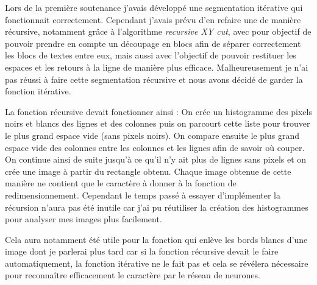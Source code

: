 \documentclass[12pt]{report}
\begin{document}
Lors de la première soutenance j'avais développé une segmentation itérative qui fonctionnait correctement. Cependant j'avais prévu d'en refaire une de manière récursive, notamment grâce à l'algorithme \textit{recursive XY cut}, avec pour objectif de pouvoir prendre en compte un découpage en blocs afin de séparer correctement les blocs de textes entre eux, mais aussi avec l'objectif de pouvoir restituer les espaces et les retours à la ligne de manière plus efficace. Malheureusement je n'ai pas réussi à faire cette segmentation récursive et nous avons décidé de garder la fonction itérative. 

La fonction récursive devait fonctionner ainsi : On crée un histogramme des pixels noirs et blancs des lignes et des colonnes puis on parcourt cette liste pour trouver le plus grand espace vide (sans pixels noirs). On compare ensuite le plus grand espace vide des colonnes entre les colonnes et les lignes afin de savoir où couper. On continue ainsi de suite jusqu'à ce qu'il n'y ait plus de lignes sans pixels et on crée une image à partir du rectangle obtenu. Chaque image obtenue de cette manière ne contient que le caractère à donner à la fonction de redimensionnement.
Cependant le temps passé à essayer d'implémenter la récursion n'aura pas été inutile car j'ai pu réutiliser la création des histogrammes pour analyser mes images plus facilement. 

\newpage

Cela aura notamment été utile pour la fonction qui enlève les bords blancs d'une image dont je parlerai plus tard car si la fonction récursive devait le faire automatiquement, la fonction itérative ne le fait pas et cela se révélera nécessaire pour reconnaître efficacement le caractère par le réseau de neurones.
\end{document}
